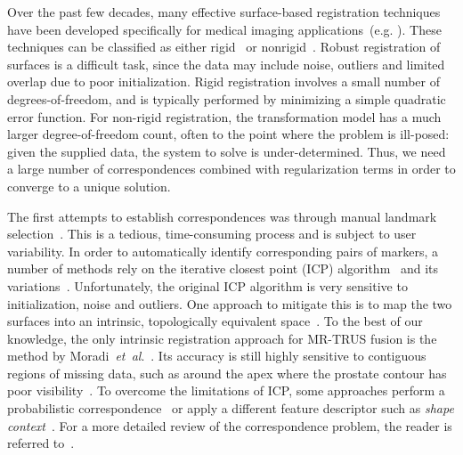 \documentclass[journal]{IEEEtran}
\begin{document}
Over the past few decades, many effective surface-based registration techniques have been developed specifically for medical imaging applications~(e.g. \cite{Besl92a,Brown07a,Chui03a,Huang07a,Jian11a,Myronenko10a,Wand09a}). These techniques can be classified as either rigid~\cite{Besl92a} or nonrigid~\cite{Brown07a,Chui03a,Huang07a,Masutani01a,Myronenko10a,Wand09a}. Robust registration of surfaces is a difficult task, since the data may include noise, outliers and limited overlap due to poor initialization. Rigid registration involves a small number of degrees-of-freedom, and is typically performed by minimizing a simple quadratic error function.  For non-rigid registration, the transformation model has a much larger degree-of-freedom count, often to the point where the problem is ill-posed: given the supplied data, the system to solve is under-determined.  Thus, we need a large number of correspondences combined with regularization terms in order to converge to a unique solution.

The first attempts to establish correspondences was through manual landmark selection~\cite{Cootes95a}. This is a tedious, time-consuming process and is subject to user variability. In order to automatically identify corresponding pairs of markers, a number of methods rely on the iterative closest point (ICP) algorithm~\cite{Besl92a,Zhang94a} and its variations~\cite{Besl92a,Rohr96a,Rucker14a,Zhang94a}. Unfortunately, the original ICP algorithm is very sensitive to initialization, noise and outliers. One approach to mitigate this is to map the two surfaces into an intrinsic, topologically equivalent space~\cite{Huang07a,Yeo10a,Moradi12a}. To the best of our knowledge, the only intrinsic registration approach for MR-TRUS fusion is the method by Moradi~\textit{et~al}.~\cite{Moradi12a}. Its accuracy is still highly sensitive to contiguous regions of missing data, such as around the apex where the prostate contour has poor visibility~\cite{Moradi12a}. To overcome the limitations of ICP, some approaches perform a probabilistic correspondence~\cite{Chui03a,Jian11a,Myronenko10a} or apply a different feature descriptor such as \emph{shape context}~\cite{Belongie02a}. For a more detailed review of the correspondence problem, the reader is referred to~\cite{Kaick11a}.
\end{document}
